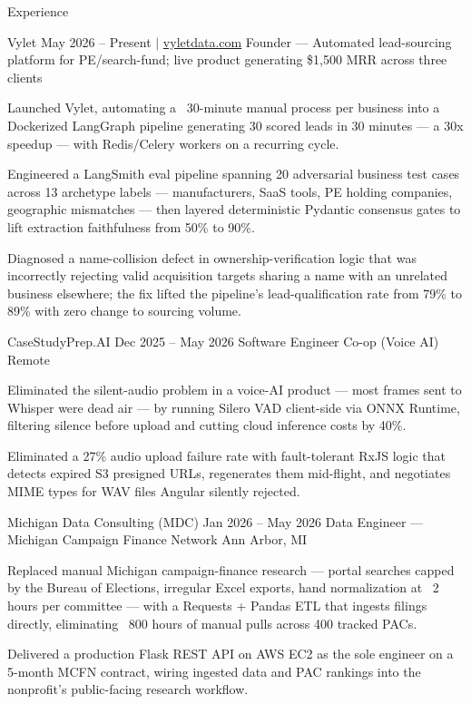 \documentclass[
	11pt
]{../../../template}
\begin{document}
	\begin{rSection}{E}{xperience}
		\begin{rSectionEntry}
			{Vylet}
			{May 2026 -- Present $\vert$ \href{https://vyletdata.com}{vyletdata.com}}
			{Founder --- Automated lead-sourcing platform for PE/search-fund; live product generating \$1,500 MRR across three clients}
			{}
			{}

			\item Launched Vylet, automating a ~30-minute manual process per business into a Dockerized LangGraph pipeline generating 30 scored leads in 30 minutes --- a 30x speedup --- with Redis/Celery workers on a recurring cycle.
			\item Engineered a LangSmith eval pipeline spanning 20 adversarial business test cases across 13 archetype labels --- manufacturers, SaaS tools, PE holding companies, geographic mismatches --- then layered deterministic Pydantic consensus gates to lift extraction faithfulness from 50\% to 90\%.
			\item Diagnosed a name-collision defect in ownership-verification logic that was incorrectly rejecting valid acquisition targets sharing a name with an unrelated business elsewhere; the fix lifted the pipeline's lead-qualification rate from 79\% to 89\% with zero change to sourcing volume.
		\end{rSectionEntry}

		\begin{rSectionEntry}
			{CaseStudyPrep.AI}
			{Dec 2025 -- May 2026}
			{Software Engineer Co-op (Voice AI)}
			{}
			{Remote}

			\item Eliminated the silent-audio problem in a voice-AI product --- most frames sent to Whisper were dead air --- by running Silero VAD client-side via ONNX Runtime, filtering silence before upload and cutting cloud inference costs by 40\%.
			\item Eliminated a 27\% audio upload failure rate with fault-tolerant RxJS logic that detects expired S3 presigned URLs, regenerates them mid-flight, and negotiates MIME types for WAV files Angular silently rejected.
		\end{rSectionEntry}

		\begin{rSectionEntry}
			{Michigan Data Consulting (MDC)}
			{Jan 2026 -- May 2026}
			{Data Engineer --- Michigan Campaign Finance Network}
			{}
			{Ann Arbor, MI}

			\item Replaced manual Michigan campaign-finance research --- portal searches capped by the Bureau of Elections, irregular Excel exports, hand normalization at ~2 hours per committee --- with a Requests + Pandas ETL that ingests filings directly, eliminating ~800 hours of manual pulls across 400 tracked PACs.
			\item Delivered a production Flask REST API on AWS EC2 as the sole engineer on a 5-month MCFN contract, wiring ingested data and PAC rankings into the nonprofit's public-facing research workflow.
		\end{rSectionEntry}
	\end{rSection}
\end{document}
